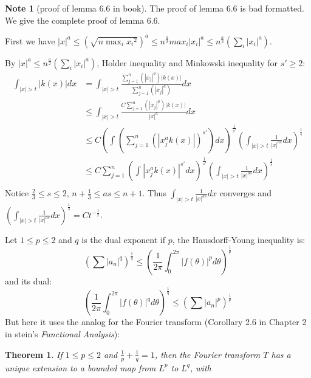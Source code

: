 \documentclass{report}
\theoremstyle{definition}
\newtheorem{note}{Note}
\theoremstyle{definition}
\theoremstyle{plain}
\newtheorem{theorem}{Theorem}
\numberwithin{theorem}{subsection}
\numberwithin{remark}{subsection}
\newcommand{\abs}[1]{\left\lvert#1\right\rvert}
\begin{document}
\begin{note}[proof of lemma 6.6 in book]
    The proof of lemma 6.6 is bad formatted. We give the complete proof of lemma 6.6.\par
    First we have $\abs{x}^a\leq (\sqrt{n\max_i{x_i}^2})^a\leq n^{\frac{a}{2}}max_i \abs{x_i}^a\leq n^{\frac{a}{2}}(\sum_i \abs{x_i}^a)$.\par
    By $\abs{x}^a\leq n^{\frac{a}{2}}(\sum_i \abs{x_i}^a)$, Holder inequality and Minkowski inequality for $s'\geq 2$:
    \begin{align*}
        \int_{\abs{x}>t}^{}{\abs{k(x)}dx} & = \int_{\abs{x}>t}^{}{\frac{\sum_{j=1}^n(\abs{x_j}^a)\abs{k(x)}}{\sum_{j=1}^n(\abs{x_j}^a)}dx}                                     \\
                                          & \leq \int_{\abs{x}>t}^{}{\frac{C\sum_{j=1}^n(\abs{x_j}^a)\abs{k(x)}}{\abs{x}^a}dx}                                                 \\
                                          & \leq C(\int_{}(\sum_{j=1}^n(\abs{x_j^ak(x)})^{s'})dx)^{\frac{1}{s'}}  (\int_{\abs{x}>t}^{} \frac{1}{\abs{x}^{as}}dx)^{\frac{1}{s}} \\
                                          & \leq C\sum_{j=1}^n(\int_{}\abs{x_j^ak(x)}^{s'}dx)^{\frac{1}{s'}}  (\int_{\abs{x}>t}^{} \frac{1}{\abs{x}^{as}}dx)^{\frac{1}{s}}     \\
    \end{align*}
    Notice $\frac{2}{3}\leq s\leq 2$, $n+\frac{1}{3}\leq as\leq n+1$. Thus $\int_{\abs{x}>t}^{} \frac{1}{\abs{x}^{as}}dx$ converges and
    $(\int_{\abs{x}>t}^{} \frac{1}{\abs{x}^{as}}dx)^{\frac{1}{s}}=Ct^{-\frac{1}{2}}$.\par
    Let $1\leq p\leq 2$ and $q$ is the dual exponent if $p$, the Hausdorff-Young inequality is:
    \begin{equation*}
        (\sum\abs{a_n}^q)^\frac{1}{q} \leq(\frac{1}{2\pi}\int_{0}^{2\pi}\abs{f(\theta)}^p d\theta)^\frac{1}{p}
    \end{equation*}
    and its dual:
    \begin{equation*}
        (\frac{1}{2\pi}\int_{0}^{2\pi}\abs{f(\theta)}^q d\theta)^\frac{1}{q}\leq(\sum\abs{a_n}^p)^\frac{1}{p}
    \end{equation*}
    But here it uses the analog for the Fourier transform (Corollary 2.6 in Chapter 2 in stein's \emph{Functional Analysis}):
    \begin{theorem}\label{Hausdorff-Young inequality}
        If $1\leq p\leq 2$ and $\frac{1}{p}+\frac{1}{q}=1$, then the Fourier transform $T$ has a unique extension to a bounded map from $L^p$ to $L^q$, with

\end{theorem}
\end{note}
\end{document}
